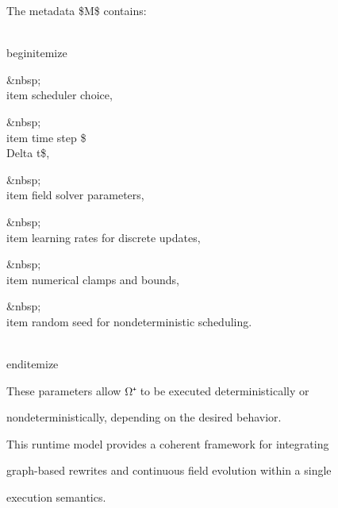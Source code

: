 The metadata \$M\$ contains:

\\begin{itemize}

&nbsp;\\item scheduler choice,

&nbsp;\\item time step \$\\Delta t\$,

&nbsp;\\item field solver parameters,

&nbsp;\\item learning rates for discrete updates,

&nbsp;\\item numerical clamps and bounds,

&nbsp;\\item random seed for nondeterministic scheduling.

\\end{itemize}

These parameters allow Ω⁺ to be executed deterministically or

nondeterministically, depending on the desired behavior.

This runtime model provides a coherent framework for integrating

graph-based rewrites and continuous field evolution within a single

execution semantics.

